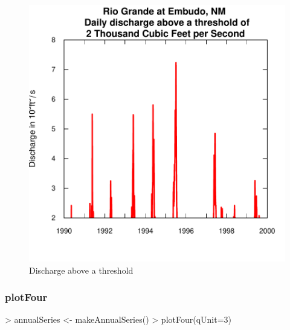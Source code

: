 \documentclass[a4paper,11pt]{article}
\begin{document}
\begin{figure}[ht]
\begin{center}

\includegraphics{EGRET-figplotQTimeDailyFig}
\end{center}
\caption{Discharge above a threshold}
\label{fig:plotQTimeDaily}
\end{figure}

\FloatBarrier
\subsubsection{plotFour}
\label{sec:plotFour}

\begin{Schunk}
\begin{Sinput}
> annualSeries <- makeAnnualSeries()
> plotFour(qUnit=3)
\end{Sinput}
\end{Schunk}
\end{document}
